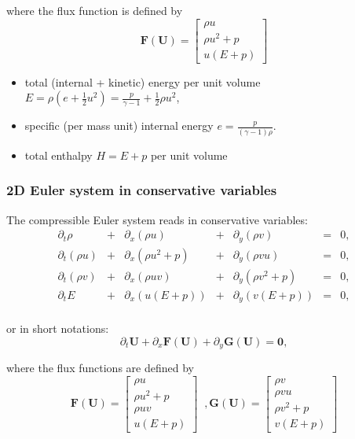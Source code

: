 \documentclass{article}
\begin{document}
where the flux function is defined by
\begin{equation}
  \mathbf{F(U)} = \left [
  \begin{array}{c}
    \rho u \\
    \rho u^2 + p \\
    u (E + p)
  \end{array} \right]
\end{equation}

\begin{itemize}
\item total (internal + kinetic) energy per unit volume $E = \rho \left( e + \frac{1}{2} u^2 \right) = \frac{p}{\gamma-1} + \frac{1}{2} \rho u^2$,
\item specific (per mass unit) internal energy $e=\frac{p}{(\gamma-1)\rho}$.
\item total enthalpy $H = E + p$ per unit volume
\end{itemize}


\subsubsection*{2D Euler system in conservative variables}
The compressible Euler system reads in conservative variables:\\
\begin{equation}
  \begin{array}{ccccccc}
    \partial_t \rho & + & \partial_x(\rho u) & + & \partial_y(\rho v) & = & 0,\\
    \partial_t (\rho u) & + & \partial_x(\rho u^2+p) & + & \partial_y(\rho v u) & = & 0,\\
    \partial_t (\rho v) & + & \partial_x(\rho u v) & + & \partial_y(\rho v^2+p) & = & 0,\\
    \partial_t E & + & \partial_x (u(E+p)) & + & \partial_y (v(E+p)) & = & 0,\\
  \end{array}
\end{equation}

or in short notations:
\begin{equation*}
  \partial_t \mathbf{U} + \partial_x \mathbf{F(U)} + \partial_y \mathbf{G(U)} = \mathbf{0},
\end{equation*}

where the flux functions are defined by
\begin{equation}
  \mathbf{F(U)} = \left [
  \begin{array}{c}
    \rho u \\
    \rho u^2 + p \\
    \rho u v \\
    u (E + p)
  \end{array} \right]
  \;\; ,
  \mathbf{G(U)} = \left [
  \begin{array}{c}
    \rho v \\
    \rho v u \\
    \rho v^2 + p \\
    v (E + p)
  \end{array} \right]
\end{equation}
\end{document}
